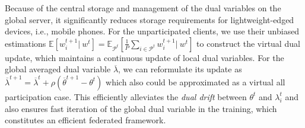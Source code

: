 Because of the central storage and management of the dual variables on the global server, it significantly reduces storage requirements for lightweight-edged devices, i.e., mobile phones. For the unparticipated clients, we use their unbiased estimations $\mathbb{E}\left[w_i^{t+1}\vert \ w^{t}\right]=\mathbb{E}_{\mathcal{P}^t}\left[\frac{1}{P}\sum_{i\in\mathcal{P}^t}w_i^{t+1}\vert \ w^{t}\right]$ to construct the virtual dual update, which maintains a continuous update of local dual variables. For the global averaged dual variable $\overline{\lambda}$, we can reformulate its update as $\overline{\lambda}^{t+1}=\overline{\lambda}^t + \rho(\overline{\theta}^{t+1} - \theta^t)$ which also could be approximated as a virtual all participation case. This efficiently alleviates the \textit{dual drift} between $\theta^t$ and $\lambda_i^t$ and also ensures fast iteration of the global dual variable in the training, which constitutes an efficient federated framework. 



